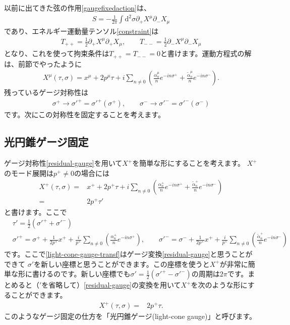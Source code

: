\documentclass[report,paper=a4, fontsize=12pt, line_length=16cm, number_of_lines=34,dvipdfmx]{jlreq}
\numberwithin{equation}{chapter}
\numberwithin{equation}{section}
\newcommand{\del}{\partial}
\newcommand{\alphat}{\tilde{\alpha}}
\newcommand{\di}{\mathrm{d}}
\begin{document}
以前に出てきた弦の作用\eqref{gaugefixedaction}は、
\begin{align}
S=-\frac{1}{2\pi}\int \di^2\sigma \del_{+}X^{\mu}\del_{-}X_{\mu}
\end{align}
であり、エネルギー運動量テンソル\eqref{constraint}は
\begin{align}
T_{++}=\frac12 \del_{+}X^{\mu}\del_{+}X_{\mu},\qquad
T_{--}=\frac12 \del_{-}X^{\mu}\del_{-}X_{\mu}
\label{EMtensor}
\end{align}
となり、これを使って拘束条件は$T_{++}=T_{--}=0$と書けます。運動方程式の解は、前節でやったように
\begin{align}
X^{\mu}(\tau,\sigma)=x^{\mu}+2p^{\mu}\tau+i\sum_{n\ne 0} \left(
\frac{\alpha^{\mu}_{n}}{n}e^{-in\sigma^{+}}
+\frac{\alphat^{\mu}_{n}}{n}e^{-in\sigma^{-}}
\right).
\end{align}
残っているゲージ対称性は
\begin{align}
\sigma^{+}\to \sigma'^{+}=\sigma'^{+}(\sigma^{+})
,\qquad \sigma^{-}\to \sigma'^{-}=\sigma'^{-}(\sigma^{-})
\label{residual-gauge}
\end{align}
です。次にこの対称性を固定することを考えます。
\subsection{光円錐ゲージ固定}
ゲージ対称性\eqref{residual-gauge}を用いて$X^{+}$を簡単な形にすることを考えます。
$X^{+}$のモード展開は$p^{+}\ne 0$の場合には
\begin{align}
X^{+}(\tau,\sigma)=&x^{+}+2p^{+}\tau+i\sum_{n\ne 0} \left(
\frac{\alpha^{+}_{n}}{n}e^{-in\sigma^{+}}
+\frac{\alphat^{+}_{n}}{n}e^{-in\sigma^{-}}
\right)\\
=&2p^{+}\tau'
\end{align}
と書けます。ここで
\begin{align}
&\tau'=\frac12(\sigma'^{+}+\sigma'^{-})\\
&
\sigma'^{+}=\sigma^{+}+\frac{1}{2p^{+}}x^{+}+\frac{i}{p^{+}}\sum_{n\ne 0} \left(
\frac{\alpha^{+}_{n}}{n}e^{-in\sigma^{+}}
\right),\qquad
\sigma'^{-}=\sigma^{-}+\frac{1}{2p^{+}}x^{+}+\frac{i}{p^{+}}\sum_{n\ne 0} \left(
\frac{\alphat^{+}_{n}}{n}e^{-in\sigma^{-}}
\right)\label{light-cone-gauge-transf}
\end{align}
です。ここで\eqref{light-cone-gauge-transf}はゲージ変換\eqref{residual-gauge}と思うことができて
$\sigma'$を新しい座標と思うことができます。この座標を使うと$X^{+}$が非常に簡単な形に書けるのです。新しい座標でも$\sigma'=\frac12(\sigma'^{+}-\sigma'^{-})$の周期は$2\pi$です。まとめると（${}'$を省略して）\eqref{residual-gauge}の変換を用いて$X^{+}$を次のような形にすることができます。
\begin{align}
X^{+}(\tau,\sigma)=&2p^{+}\tau.
\label{light-cone-gauge-fixing}
\end{align}
このようなゲージ固定の仕方を「光円錐ゲージ(light-cone gauge)」と呼びます。
\end{document}
